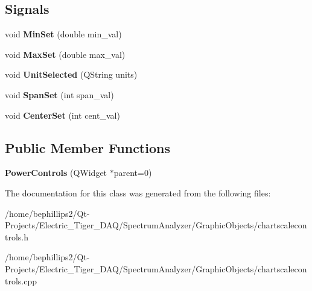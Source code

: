 \subsection*{Signals}
\begin{DoxyCompactItemize}
\item 
void {\bfseries Min\+Set} (double min\+\_\+val)\hypertarget{class_power_controls_ab9a1d9f89f194471d0e31f6dad01086a}{}\label{class_power_controls_ab9a1d9f89f194471d0e31f6dad01086a}

\item 
void {\bfseries Max\+Set} (double max\+\_\+val)\hypertarget{class_power_controls_aef88de9bf3ae6738020c9334ee79e857}{}\label{class_power_controls_aef88de9bf3ae6738020c9334ee79e857}

\item 
void {\bfseries Unit\+Selected} (Q\+String units)\hypertarget{class_power_controls_a6077789456f1780b9f86569256334a38}{}\label{class_power_controls_a6077789456f1780b9f86569256334a38}

\item 
void {\bfseries Span\+Set} (int span\+\_\+val)\hypertarget{class_power_controls_ad146203ff843dd336cca6838be0aa9b4}{}\label{class_power_controls_ad146203ff843dd336cca6838be0aa9b4}

\item 
void {\bfseries Center\+Set} (int cent\+\_\+val)\hypertarget{class_power_controls_a79b389c9c31f94eb5b0ae8fc771b1c7d}{}\label{class_power_controls_a79b389c9c31f94eb5b0ae8fc771b1c7d}

\end{DoxyCompactItemize}
\subsection*{Public Member Functions}
\begin{DoxyCompactItemize}
\item 
{\bfseries Power\+Controls} (Q\+Widget $\ast$parent=0)\hypertarget{class_power_controls_a73bb29ad05d93d0d945596b02b3a058a}{}\label{class_power_controls_a73bb29ad05d93d0d945596b02b3a058a}

\end{DoxyCompactItemize}


The documentation for this class was generated from the following files\+:\begin{DoxyCompactItemize}
\item 
/home/bephillips2/\+Qt-\/\+Projects/\+Electric\+\_\+\+Tiger\+\_\+\+D\+A\+Q/\+Spectrum\+Analyzer/\+Graphic\+Objects/chartscalecontrols.\+h\item 
/home/bephillips2/\+Qt-\/\+Projects/\+Electric\+\_\+\+Tiger\+\_\+\+D\+A\+Q/\+Spectrum\+Analyzer/\+Graphic\+Objects/chartscalecontrols.\+cpp\end{DoxyCompactItemize}
